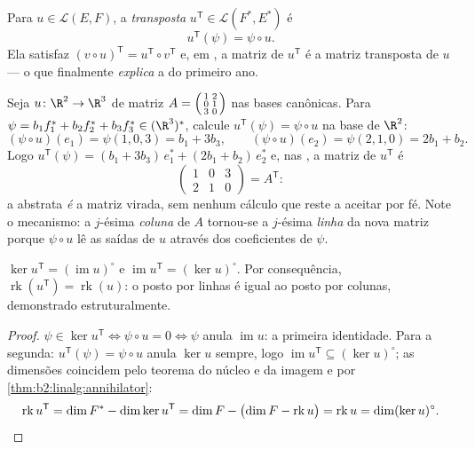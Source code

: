 \begin{definition}\label{def:b2:linalg:transpose}
Para $u \in \mathcal{L}(E, F)$, a \emph{transposta} $u^{\mathsf T} \in \mathcal{L}(F^*, E^*)$ é
\[
u^{\mathsf T}(\psi) = \psi \circ u .
\]
Ela satisfaz $(v \circ u)^{\mathsf T} = u^{\mathsf T} \circ v^{\mathsf
T}$ e, em , a matriz de $u^{\mathsf T}$ é a
matriz transposta de $u$ --- o que finalmente \emph{explica} a
 do primeiro ano.
\end{definition}

\begin{example}\label{ex:b2:linalg:transposework}
Seja $u \colon \R^2 \to \R^3$ de matriz $A =
\begin{psmallmatrix} 1 & 2\\ 0 & 1\\ 3 & 0\end{psmallmatrix}$ nas
bases canônicas. Para $\psi = b_1f_1^* + b_2f_2^* + b_3f_3^*
\in (\R^3)^*$, calcule $u^{\mathsf T}(\psi) = \psi \circ u$ na
base de $\R^2$:
\[
(\psi \circ u)(e_1) = \psi(1, 0, 3) = b_1 + 3b_3,
\qquad
(\psi \circ u)(e_2) = \psi(2, 1, 0) = 2b_1 + b_2 .
\]
Logo $u^{\mathsf T}(\psi) = (b_1 + 3b_3)\,e_1^* + (2b_1 +
b_2)\,e_2^*$ e, nas , a matriz de $u^{\mathsf T}$
é
\[
\begin{pmatrix} 1 & 0 & 3\\ 2 & 1 & 0\end{pmatrix}
= A^{\mathsf T} :
\]
a  abstrata \emph{é} a matriz virada, sem nenhum
cálculo que reste a aceitar por fé. Note o mecanismo: a
$j$-ésima \emph{coluna} de $A$ tornou-se a $j$-ésima \emph{linha} da
nova matriz porque $\psi \circ u$ lê as saídas de $u$ através
dos coeficientes de $\psi$.
\end{example}

\begin{proposition}\label{prop:b2:linalg:transposerank}
$\ker u^{\mathsf T} = (\operatorname{im} u)^{\circ}$ e
$\operatorname{im} u^{\mathsf T} = (\ker u)^{\circ}$. Por consequência,
$\operatorname{rk}(u^{\mathsf T}) = \operatorname{rk}(u)$: o posto por linhas
é igual ao posto por colunas, demonstrado estruturalmente.
\end{proposition}

\begin{proof}
$\psi \in \ker u^{\mathsf T} \iff \psi \circ u = 0 \iff \psi$ anula
$\operatorname{im} u$: a primeira identidade. Para a segunda: $u^{\mathsf
T}(\psi) = \psi \circ u$ anula $\ker u$ sempre, logo
$\operatorname{im} u^{\mathsf T} \subseteq (\ker u)^\circ$;
as dimensões coincidem pelo teorema do núcleo e da imagem e por
\cref{thm:b2:linalg:annihilator}:
\[
\operatorname{rk} u^{\mathsf T} = \dim F^* - \dim\ker u^{\mathsf T}
= \dim F - \bigl(\dim F - \operatorname{rk} u\bigr)
= \operatorname{rk} u
= \dim (\ker u)^{\circ} . \qedhere
\]
\end{proof}

